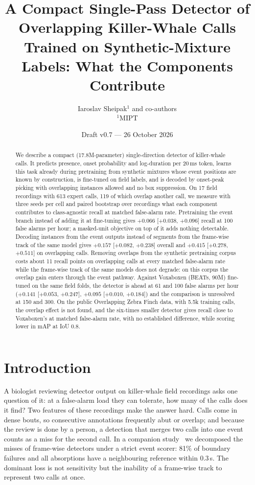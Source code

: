 \documentclass[10pt,twocolumn]{article}
\title{A Compact Single-Pass Detector of Overlapping Killer-Whale Calls\\Trained on Synthetic-Mixture Labels: What the Components Contribute}
\author{Iaroslav Sheipak$^{1}$ and co-authors \\[2pt] \small $^1$MIPT}
\date{Draft v0.7 --- 26 October 2026}
\begin{document}
\maketitle

\begin{abstract}
We describe a compact (17.8M-parameter) single-direction detector of killer-whale calls. It predicts presence, onset probability and log-duration per 20\,ms token, learns this task already during pretraining from synthetic mixtures whose event positions are known by construction, is fine-tuned on field labels, and is decoded by onset-peak picking with overlapping instances allowed and no box suppression. On 17 field recordings with 613 expert calls, 119 of which overlap another call, we measure with three seeds per cell and paired bootstrap over recordings what each component contributes to class-agnostic recall at matched false-alarm rate. Pretraining the event branch instead of adding it at fine-tuning gives $+0.066$ [$+0.038$, $+0.096$] recall at 100 false alarms per hour; a masked-unit objective on top of it adds nothing detectable. Decoding instances from the event outputs instead of segments from the frame-wise track of the same model gives $+0.157$ [$+0.082$, $+0.238$] overall and $+0.415$ [$+0.278$, $+0.511$] on overlapping calls. Removing overlaps from the synthetic pretraining corpus costs about 11 recall points on overlapping calls at every matched false-alarm rate while the frame-wise track of the same models does not degrade: on this corpus the overlap gain enters through the event pathway. Against Voxaboxen (BEATs, 90M) fine-tuned on the same field folds, the detector is ahead at 61 and 100 false alarms per hour ($+0.141$ [$+0.053$, $+0.247$], $+0.095$ [$+0.010$, $+0.184$]) and the comparison is unresolved at 150 and 300. On the public Overlapping Zebra Finch data, with 5.5k training calls, the overlap effect is not found, and the six-times smaller detector gives recall close to Voxaboxen's at matched false-alarm rate, with no established difference, while scoring lower in mAP at IoU 0.8.
\end{abstract}

\section{Introduction}
A biologist reviewing detector output on killer-whale field recordings asks one question of it: at a false-alarm load they can tolerate, how many of the calls does it find? Two features of these recordings make the answer hard. Calls come in dense bouts, so consecutive annotations frequently abut or overlap; and because the review is done by a person, a detection that merges two calls into one event counts as a miss for the second call. In a companion study~\citep{sheipak2026what} we decomposed the misses of frame-wise detectors under a strict event scorer: 81\% of boundary failures and all absorptions have a neighbouring reference within 0.3\,s. The dominant loss is not sensitivity but the inability of a frame-wise track to represent two calls at once.
\end{document}
